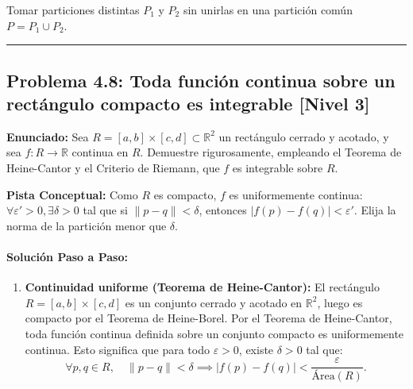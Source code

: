 \documentclass[11pt,a4paper]{article}
\begin{document}
\begin{trapbox}
Tomar particiones distintas $P_1$ y $P_2$ sin unirlas en una partición común $P = P_1 \cup P_2$.
\end{trapbox}

\vspace{0.5cm}
\hrule
\vspace{0.5cm}

\subsection*{Problema 4.8: Toda función continua sobre un rectángulo compacto es integrable \hfill \color{primaryblue}\small[Nivel 3]}

\begin{tcolorbox}[colback=white,colframe=gray!40,arc=1mm,boxrule=0.5pt,left=3mm,right=3mm,top=2mm,bottom=2mm]
\textbf{Enunciado:} Sea $R = [a,b] \times [c,d] \subset \mathbb{R}^2$ un rectángulo cerrado y acotado, y sea $f: R \to \mathbb{R}$ continua en $R$. Demuestre rigurosamente, empleando el Teorema de Heine-Cantor y el Criterio de Riemann, que $f$ es integrable sobre $R$.
\end{tcolorbox}

\begin{tcolorbox}[colback=yellow!4,colframe=accentamber!70,arc=1mm,boxrule=0.5pt,left=3mm,right=3mm,top=1.5mm,bottom=1.5mm]
\textbf{Pista Conceptual:} Como $R$ es compacto, $f$ es uniformemente continua: $\forall \varepsilon' > 0, \exists \delta > 0$ tal que si $\|p - q\| < \delta$, entonces $|f(p) - f(q)| < \varepsilon'$. Elija la norma de la partición menor que $\delta$.
\end{tcolorbox}

\paragraph{Solución Paso a Paso:}\par
\begin{enumerate}[label=\textbf{\arabic*.}]
\item \textbf{Continuidad uniforme (Teorema de Heine-Cantor):}
El rectángulo $R = [a,b] \times [c,d]$ es un conjunto cerrado y acotado en $\mathbb{R}^2$, luego es compacto por el Teorema de Heine-Borel.
Por el Teorema de Heine-Cantor, toda función continua definida sobre un conjunto compacto es uniformemente continua.
Esto significa que para todo $\varepsilon > 0$, existe $\delta > 0$ tal que:
\begin{equation*}
\forall p, q \in R, \quad \|p - q\| < \delta \implies |f(p) - f(q)| < \frac{\varepsilon}{\text{Área}(R)}.
\end{equation*}
\end{enumerate}
\end{document}
